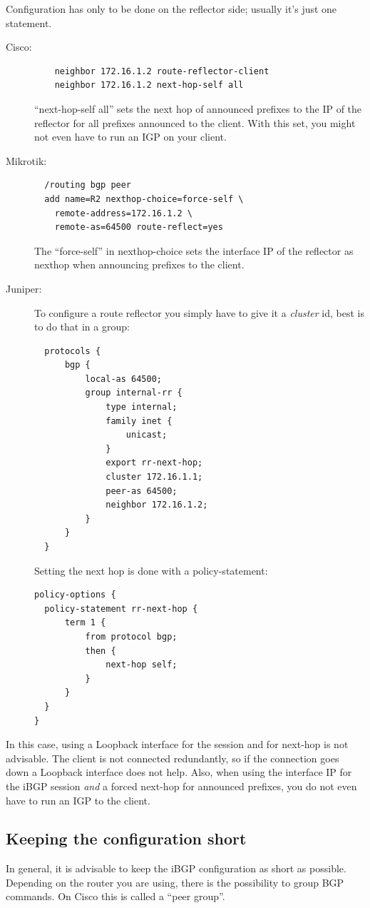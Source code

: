 Configuration has only to be done on the reflector side; usually it's just one statement.
\begin{description}
  \item[Cisco:] \begin{verbatim}
    neighbor 172.16.1.2 route-reflector-client
    neighbor 172.16.1.2 next-hop-self all
\end{verbatim}
  ``next-hop-self all'' sets the next hop of announced prefixes to the IP of the reflector for all prefixes announced to the client. With this set, you might not even have to run an \gls{IGP} on your client.
  \item[Mikrotik:] \begin{verbatim}
  /routing bgp peer
  add name=R2 nexthop-choice=force-self \
    remote-address=172.16.1.2 \
    remote-as=64500 route-reflect=yes
\end{verbatim}
The ``force-self'' in nexthop-choice sets the interface IP of the reflector as nexthop when announcing prefixes to the client.
  \item[Juniper:] To configure a route reflector you simply have to give it a \emph{cluster} id, best is to do that in a group: \begin{verbatim}
  protocols {
      bgp {
          local-as 64500;
          group internal-rr {
              type internal;
              family inet {
                  unicast;
              }
              export rr-next-hop;
              cluster 172.16.1.1;
              peer-as 64500;
              neighbor 172.16.1.2;
          }
      }
  }
\end{verbatim}
Setting the next hop is done with a policy-statement: \begin{verbatim}
policy-options {
  policy-statement rr-next-hop {
      term 1 {
          from protocol bgp;
          then {
              next-hop self;
          }
      }
  }
}
\end{verbatim}
\end{description}

In this case, using a Loopback interface for the session and for next-hop is not advisable. The client is not connected redundantly, so if the connection goes down a Loopback interface does not help. Also, when using the interface IP for the iBGP session \emph{and} a forced next-hop for announced prefixes, you do not even have to run an \gls{IGP} to the client.

\subsection{Keeping the configuration short}
In general, it is advisable to keep the iBGP configuration as short as possible. Depending on the router you are using, there is the possibility to group BGP commands. On Cisco this is called a ``peer group''.

